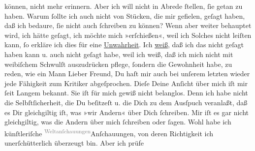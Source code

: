 \begin{ledgroupsized}[t]{13cm}
               können, nicht mehr erinnern. Aber ich will nicht in Abrede ſtellen, ſie getan zu
               haben. {\pb}Warum ſollte ich auch nicht von Stücken, die mir
               gefielen, geſagt haben, daß ich bedaure, ſie nicht auch ſchreiben zu können? Wenn
               aber weiter behauptet wird, ich hätte geſagt, ich möchte mich »erſchießen«, weil ich
               Solches nicht leiſten kann, ſo erkläre ich dies für eine \uline{Unwahrheit}.  Ich \uline{weiß}, daß ich das nicht geſagt haben kann u. auch
               nicht geſagt habe, weil ich weiß, daß ich mich nicht mit weibiſchem Schwulſt {\pb}auszudrücken pflege, ſondern die Gewohnheit habe,
               zu reden, wie ein Mann{\dotsseven}\pend
           \pstart
           Lieber Freund, Du haſt mir auch bei unſerem letzten \label{K_L03475-10v}\label{K_L03475-10h} wieder jede Fähigkeit zum Kritiker abgeſprochen. Dieſe Deine
               Anſicht über mich iſt mir ſeit Langem bekannt. Sie iſt für mich gewiß nicht
               belanglos. Denn ich habe nicht die Selbſtſicherheit, die Du beſitzeſt u. die Dich zu
               dem Ausſpuch veranlaßt, daß es {\pb}Dir gleichgiltig
               iſt, was  »wir Andern« über Dich ſchreiben. Mir
               iſt es gar nicht gleichgiltig, was die Andern über mich ſchreiben oder ſagen. Wohl
               habe ich künſtleriſche \substVorne{}\textsuperscript{\textcolor{gray}{Weltanſchauungen}}{\allowbreak}\substDazwischen{}Anſchauungen\substHinten{}, von deren Richtigkeit ich unerſchütterlich überzeugt bin. Aber ich prüfe

\end{ledgroupsized}
